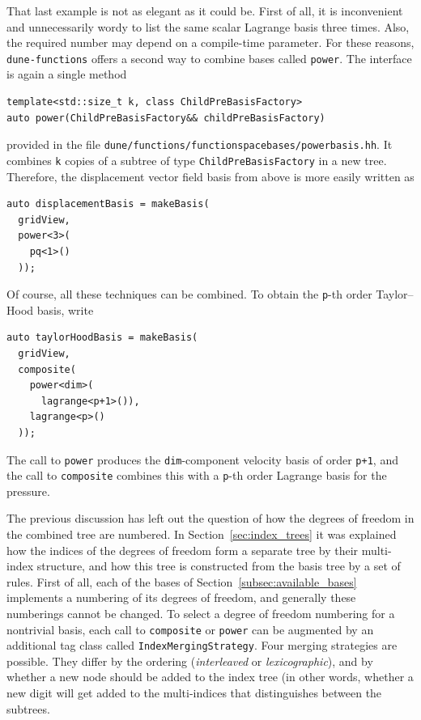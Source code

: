\documentclass[a4paper,10pt,headings=normal,bibliography=totoc]{scrartcl}
\newcommand{\cpp}[1]{\lstinline[basicstyle=\ttfamily]!#1!}
\newcommand{\dunemodule}[1]{\texttt{#1}}
\newcommand{\file}[1]{\texttt{#1}}
\begin{document}
That last example is not as elegant as it could be.  First of all, it is inconvenient and unnecessarily
wordy to list the same scalar Lagrange basis three times.  Also, the required number may depend on
a compile-time parameter.  For these reasons, \dunemodule{dune-functions}
offers a second way to combine bases called \cpp{power}.  The interface is again a single method
\begin{lstlisting}[style=Interface]
template<std::size_t k, class ChildPreBasisFactory>
auto power(ChildPreBasisFactory&& childPreBasisFactory)
\end{lstlisting}
provided in the file \file{dune/functions/functionspacebases/powerbasis.hh}.
It combines \cpp{k} copies of a subtree of type \cpp{ChildPreBasisFactory} in a new tree.  Therefore, the
displacement vector field basis from above is more easily written as
\begin{lstlisting}[style=Example]
auto displacementBasis = makeBasis(
  gridView,
  power<3>(
    pq<1>()
  ));
\end{lstlisting}
Of course, all these techniques can be combined. To obtain the \cpp{p}-th order Taylor--Hood basis,
write
\begin{lstlisting}[style=Example]
auto taylorHoodBasis = makeBasis(
  gridView,
  composite(
    power<dim>(
      lagrange<p+1>()),
    lagrange<p>()
  ));
\end{lstlisting}
The call to \cpp{power} produces the \cpp{dim}-component velocity basis of order \cpp{p+1},
and the call to \cpp{composite} combines this with a \cpp{p}-th order Lagrange basis for the pressure.

\bigskip

The previous discussion has left out the question of how the degrees of freedom in the combined tree
are numbered.  In Section~\ref{sec:index_trees} it was explained how the indices
of the degrees of freedom form a separate tree by their multi-index structure, and how this tree
is constructed from the basis tree by a set of rules.  First of all, each of the bases of
Section~\ref{subsec:available_bases} implements a numbering of its degrees of freedom,
and generally these numberings cannot be changed.
To select a degree of freedom numbering for a nontrivial basis,
each call to \cpp{composite} or \cpp{power} can be augmented by an additional
tag class called \cpp{IndexMergingStrategy}. Four merging strategies are possible.  They differ by the ordering
(\emph{interleaved} or \emph{lexicographic}), and by whether a new node should be added to the
index tree (in other words, whether a new digit will get added to the multi-indices that
distinguishes between the subtrees.
\end{document}
